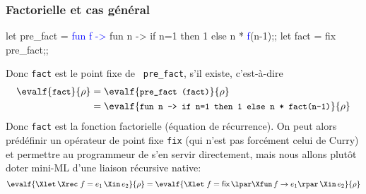 % 
\begin{frame}[containsverbatim]
\frametitle{Factorielle et cas général}

{\small
\begin{semiverbatim}
let pre_fact =
  \textcolor{blue}{fun f ->} fun n -> if n=1 then 1 else n * \textcolor{blue}{f}(n-1);;
let fact = fix pre_fact;;
\end{semiverbatim}
}
Donc \texttt{\small fact} est le point fixe de \texttt{\small
pre\_fact}, s'il existe, c'est-à-dire
\begin{align*}
\evalf{\texttt{\small fact}}{\rho} &= \evalf{\texttt{\small pre\_fact
    (fact)}}{\rho}\\
&= \evalf{\texttt{\small fun n -> if n=1 then 1 else n * fact(n-1)}}{\rho}
\end{align*}
Donc \texttt{\small fact} est la fonction factorielle (équation de
récurrence). On peut alors prédéfinir un opérateur de point fixe
\texttt{\small fix} (qui n'est pas forcément celui de Curry) et
permettre au programmeur de s'en servir directement, mais nous allons
plutôt doter mini-ML d'une liaison récursive native:
$$\evalf{\Xlet \, \Xrec \; f = e_1 \, \Xin \, e_2}{\rho} =
\evalf{\Xlet \; f = \textsf{fix} \, \lpar\Xfun \, f \rightarrow
e_1\rpar \, \Xin \, e_2}{\rho}$$

\end{frame}

